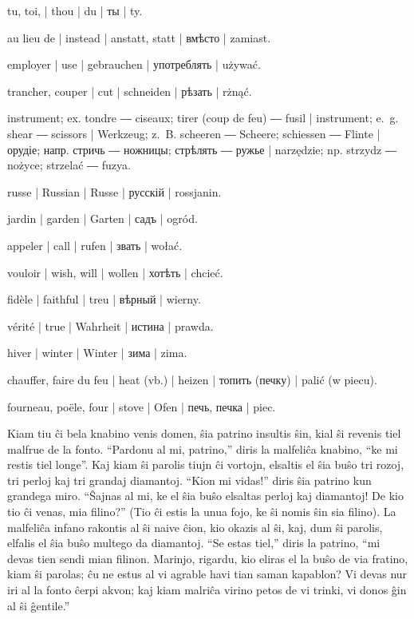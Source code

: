 \begin{ekzvocab}{1em}
 tu, toi, | thou | du | ты | ty.

 au lieu de | instead | anstatt, statt | вмѣсто | zamiast.

 employer | use | gebrauchen | употреблять | używać.

 trancher, couper | cut | schneiden | рѣзать | rżnąć.

 instrument; ex.  tondre ―  ciseaux;  tirer (coup de feu) ―  fusil | instrument; e.~g.  shear ―  scissors | Werkzeug; z.~B.  scheeren ―  Scheere;  schiessen ―  Flinte | орудіе; напр.  стричь ―  ножницы;  стрѣлять ―  ружье | narzędzie; np.  strzydz ―  nożyce;  strzelać ―  fuzya.

 russe | Russian | Russe | русскій | rossjanin.

 jardin | garden | Garten | садъ | ogród.

 appeler | call | rufen | звать | wołać.

 vouloir | wish, will | wollen | хотѣть | chcieć.

 fidèle | faithful | treu | вѣрный | wierny.

 vérité | true | Wahrheit | истина | prawda.

 hiver | winter | Winter | зима | zima.

 chauffer, faire du feu | heat (vb.) | heizen | топить (печку) | palić (w piecu).

 fourneau, poële, four | stove | Ofen | печь, печка | piec.

\end{ekzvocab}



Kiam tiu ĉi bela knabino venis domen, ŝia patrino insultis ŝin, kial ŝi revenis tiel malfrue de la fonto. “Pardonu al mi, patrino,” diris la malfeliĉa knabino, “ke mi restis tiel longe”. Kaj kiam ŝi parolis tiujn ĉi vortojn, elsaltis el ŝia buŝo tri rozoj, tri perloj kaj tri grandaj diamantoj. “Kion mi vidas!” diris ŝia patrino kun grandega miro. “Ŝajnas al mi, ke el ŝia buŝo elsaltas perloj kaj diamantoj! De kio tio ĉi venas, mia filino?” (Tio ĉi estis la unua fojo, ke ŝi nomis ŝin sia filino). La malfeliĉa infano rakontis al ŝi naive ĉion, kio okazis al ŝi, kaj, dum ŝi parolis, elfalis el ŝia buŝo multego da diamantoj. “Se estas tiel,” diris la patrino, “mi devas tien sendi mian filinon. Marinjo, rigardu, kio eliras el la buŝo de via fratino, kiam ŝi parolas; ĉu ne estus al vi agrable havi tian saman kapablon? Vi devas nur iri al la fonto ĉerpi akvon; kaj kiam malriĉa virino petos de vi trinki, vi donos ĝin al ŝi ĝentile.”

